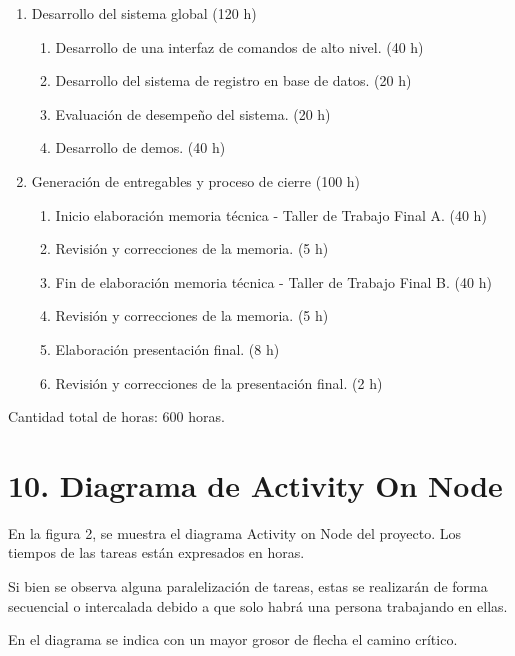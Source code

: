 \documentclass[
11pt %
]{charter}
\begin{document}
\begin{enumerate}
\item Desarrollo del sistema global (120 h)
	\begin{enumerate}
	\item Desarrollo de una interfaz de comandos de alto nivel. (40 h)
	\item Desarrollo del sistema de registro en base de datos. (20 h)
	\item Evaluación de desempeño del sistema. (20 h)
	\item Desarrollo de demos. (40 h)
	\end{enumerate}
	
\item Generación de entregables y proceso de cierre (100 h)
	\begin{enumerate}
	\item Inicio elaboración memoria técnica - Taller de Trabajo Final A. (40 h)
	\item Revisión y correcciones de la memoria. (5 h)
	\item Fin de elaboración memoria técnica - Taller de Trabajo Final B. (40 h)
	\item Revisión y correcciones de la memoria. (5 h)
	\item Elaboración presentación final. (8 h)
	\item Revisión y correcciones de la presentación final. (2 h)
	\end{enumerate}
\end{enumerate}

Cantidad total de horas: 600 horas.

\section{10. Diagrama de Activity On Node}
\label{sec:AoN}

En la figura 2, se muestra el diagrama Activity on Node del proyecto. Los tiempos de las tareas están expresados en horas.

Si bien se observa alguna paralelización de tareas, estas se realizarán de forma secuencial o intercalada debido a que solo habrá una persona trabajando en ellas.

En el diagrama se indica con un mayor grosor de flecha el camino crítico.
\end{document}
